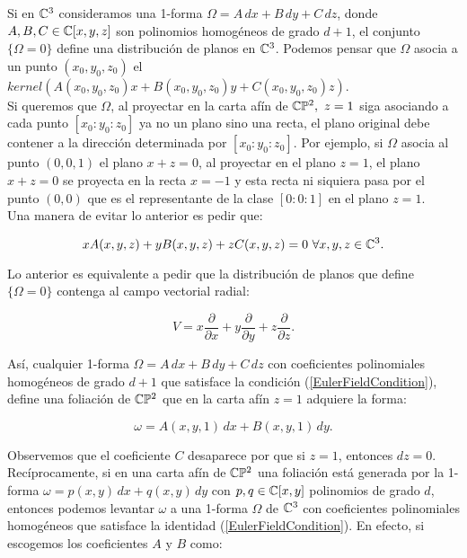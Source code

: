 Si en $\mathbb{C}^{3}$ consideramos una 1-forma $\Omega=A\, dx+B\, dy+C\, dz$, donde $A,B,C\in\mathbb{C}[x,y,z]$ son polinomios homogéneos de grado $d+1$, el conjunto $\{\Omega=0\}$ define una distribución de planos en $\mathbb{C}^{3}$. Podemos pensar que $\Omega$ asocia a un punto $(x_{0},y_{0},z_{0})$ el $kernel(A(x_{0},y_{0},z_{0})x+B(x_{0},y_{0},z_{0})y+C(x_{0},y_{0},z_{0})z)$.\\

Si queremos que $\Omega$, al proyectar en la carta afín de $\mathbb{C}\mathbb{P}^{2},\ z=1$ siga asociando a cada punto $[x_{0}:y_{0}:z_{0}]$ ya no un plano sino una recta, el plano original debe contener a la dirección determinada por $[x_{0}:y_{0}:z_{0}]$. Por ejemplo, si $\Omega$ asocia al punto $(0,0,1)$ el plano $x+z=0$, al proyectar en el plano $z=1$, el plano $x+z=0$ se proyecta en la recta $x=-1$ y esta recta ni siquiera pasa por el punto $(0,0)$ que es el representante de la clase $[0:0:1]$ en el plano $z=1$.\\

Una manera de evitar lo anterior es pedir que:

\begin{equation}
\label{EulerFieldCondition}
xA(x,y,z)+yB(x,y,z)+zC(x,y,z)=0 \,\, \forall x,y,z\in\mathbb{C}^{3}.
\end{equation}

\noindent Lo anterior es equivalente a pedir que la distribución de planos que define $\{\Omega=0\}$ contenga al campo vectorial radial:

\begin{equation}
\label{RadialVectorField}
V=x\frac{\partial}{\partial x}+y\frac{\partial}{\partial y}+z\frac{\partial}{\partial z}.
\end{equation}

\noindent Así, cualquier 1-forma $\Omega=A\, dx+B\, dy+C\, dz$ con coeficientes polinomiales homogéneos de grado $d+1$ que satisface la condición (\ref{EulerFieldCondition}), define una foliación de $\mathbb{C}\mathbb{P}^{2}$ que en la carta afín $z=1$ adquiere la forma:

\begin{equation}
\label{FormaAfin}
\omega=A(x,y,1)\, dx+B(x,y,1)\, dy.
\end{equation}

\noindent Observemos que el coeficiente $C$ desaparece por que si $z=1$, entonces $dz=0$.\\

Recíprocamente, si en una carta afín de $\mathbb{C}\mathbb{P}^{2}$ una foliación está generada por la 1-forma $\omega=p(x,y)\, dx+q(x,y)\, dy$ con $p,q\in\mathbb{C}[x,y]$ polinomios de grado $d$, entonces podemos levantar $\omega$ a una 1-forma $\Omega$ de $\mathbb{C}^{3}$ con coeficientes polinomiales homogéneos que satisface la identidad (\ref{EulerFieldCondition}). En efecto, si escogemos los coeficientes $A$ y $B$ como:

